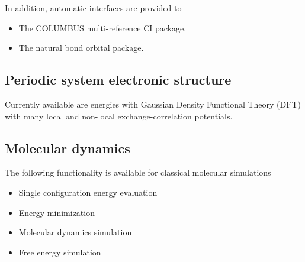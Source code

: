 In addition, automatic interfaces are provided to
\begin{itemize}
\item The COLUMBUS multi-reference CI package.
\item The natural bond orbital package.
\end{itemize}

\subsection{Periodic system electronic structure}

Currently available are energies with Gaussian Density Functional
Theory (DFT) with many local and non-local exchange-correlation
potentials.

\subsection{Molecular dynamics}

The following functionality is available for classical molecular
simulations
\begin{itemize}
\item Single configuration energy evaluation
\item Energy minimization
\item Molecular dynamics simulation
\item Free energy simulation 
\end{itemize}



